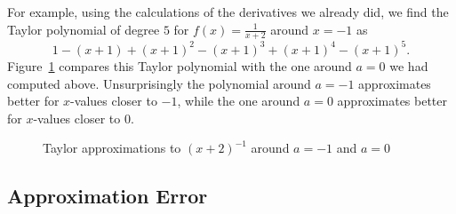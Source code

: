 For example, using the calculations of the derivatives we already did,
we find the Taylor
polynomial of degree $5$ for $f(x)=\frac{1}{x+2}$ around $x=-1$ as
\[
1-(x+1)+(x+1)^2-(x+1)^3+(x+1)^4-(x+1)^5.
\]
Figure~\ref{figtayoneoplus} compares this Taylor polynomial with the one
around $a=0$ we had computed above. Unsurprisingly the polynomial around
$a=-1$ approximates better for $x$-values closer to $-1$, while the one
around $a=0$ approximates better for $x$-values closer to $0$.
\begin{figure}
\begin{center}
\end{center}
\caption{Taylor approximations to $(x+2)^{-1}$ around $a=-1$ and $a=0$}
\label{figtayoneoplus}
\end{figure}

\subsection{Approximation Error}

